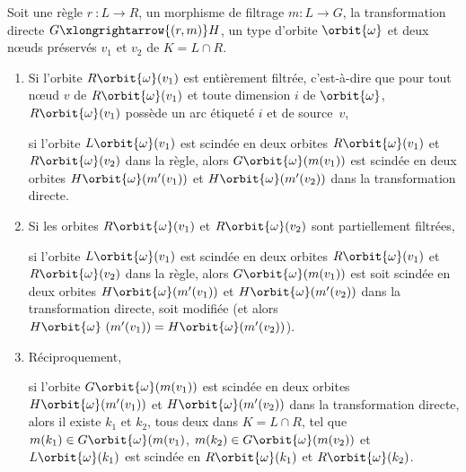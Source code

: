 \begin{proposition}
	\label{prop:base-rule_split}
	Soit une règle $r~: L \longrightarrow R$, un morphisme de filtrage $m : L \rightarrow G$, la
	transformation directe $G \xlongrightarrow{(r,m)} H$, un type d'orbite
	$\orbit{\omega}$ et deux n\oe uds préservés $v_1$ et $v_2$ de $K = L \cap R$.

	\begin{enumerate}
		\item Si l'orbite $R\orbit{\omega}(v_1)$ est entièrement filtrée, c'est-à-dire que pour tout n\oe ud $v$ de $R\orbit{\omega}(v_1)$ et toute dimension $i$ de $\orbit{\omega}$, $R\orbit{\omega}(v_1)$ possède un arc étiqueté  $i$ et de source~$v$,

		      si l'orbite $L\orbit{\omega}(v_1)$ est scindée en deux orbites $R\orbit{\omega}(v_1)$ et $R\orbit{\omega}(v_2)$ dans la règle, alors $G\orbit{\omega}(m(v_1))$ est scindée en deux orbites $H\orbit{\omega}(m'(v_1))$ et $H\orbit{\omega}(m'(v_2))$ dans la transformation directe.

		\item Si les orbites $R\orbit{\omega}(v_1)$ et $R\orbit{\omega}(v_2)$ sont partiellement filtrées,

		      si l'orbite $L\orbit{\omega}(v_1)$ est scindée en deux orbites $R\orbit{\omega}(v_1)$ et $R\orbit{\omega}(v_2)$ dans la règle, alors $G\orbit{\omega}(m(v_1))$ est soit scindée en deux orbites $H\orbit{\omega}(m'(v_1))$ et $H\orbit{\omega}(m'(v_2))$ dans la transformation directe, soit modifiée (et alors $H\orbit{\omega}~(m'(v_1)) = H\orbit{\omega}(m'(v_2))$).

		\item Réciproquement,

		      si l'orbite $G\orbit{\omega}(m(v_1))$ est scindée en deux orbites $H\orbit{\omega}(m'(v_1))$ et $H\orbit{\omega}(m'(v_2))$ dans la transformation directe, alors il existe $k_1$ et $k_2$, tous deux dans $K = L \cap R$, tel que $m(k_1) \in G\orbit{\omega}(m(v_1)$, $m(k_2) \in G\orbit{\omega}(m(v_2))$ et $L\orbit{\omega}(k_1)$ est scindée en $R\orbit{\omega}(k_1)$ et $R\orbit{\omega}(k_2)$. %


	\end{enumerate}
\end{proposition}

